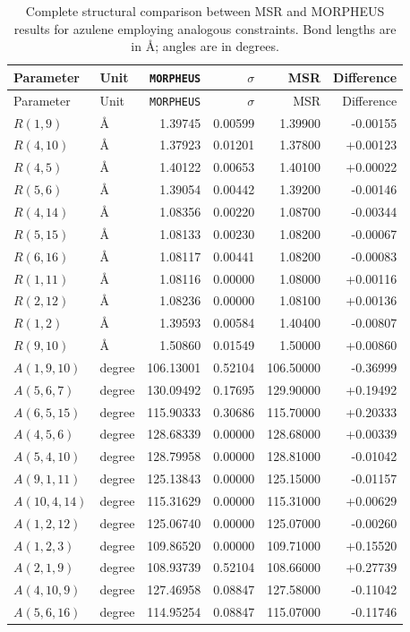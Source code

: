 \documentclass[12pt]{article}
\begin{document}
\begin{longtable}{llrrrr}
\caption{Complete structural comparison between MSR and MORPHEUS results for azulene employing
analogous constraints. Bond lengths are in \AA; angles are in degrees.}\label{tab:si-azulene-msr-parameters}\\
\toprule
Parameter & Unit & \texttt{MORPHEUS} & $\sigma$ & MSR & Difference \\
\midrule
\endfirsthead
\toprule
Parameter & Unit & \texttt{MORPHEUS} & $\sigma$ & MSR & Difference \\
\midrule
\endhead
$R(1,9)$ & \AA & 1.39745 & 0.00599 & 1.39900 & -0.00155 \\
$R(4,10)$ & \AA & 1.37923 & 0.01201 & 1.37800 & +0.00123 \\
$R(4,5)$ & \AA & 1.40122 & 0.00653 & 1.40100 & +0.00022 \\
$R(5,6)$ & \AA & 1.39054 & 0.00442 & 1.39200 & -0.00146 \\
$R(4,14)$ & \AA & 1.08356 & 0.00220 & 1.08700 & -0.00344 \\
$R(5,15)$ & \AA & 1.08133 & 0.00230 & 1.08200 & -0.00067 \\
$R(6,16)$ & \AA & 1.08117 & 0.00441 & 1.08200 & -0.00083 \\
$R(1,11)$ & \AA & 1.08116 & 0.00000 & 1.08000 & +0.00116 \\
$R(2,12)$ & \AA & 1.08236 & 0.00000 & 1.08100 & +0.00136 \\
$R(1,2)$ & \AA & 1.39593 & 0.00584 & 1.40400 & -0.00807 \\
$R(9,10)$ & \AA & 1.50860 & 0.01549 & 1.50000 & +0.00860 \\
$A(1,9,10)$ & degree & 106.13001 & 0.52104 & 106.50000 & -0.36999 \\
$A(5,6,7)$ & degree & 130.09492 & 0.17695 & 129.90000 & +0.19492 \\
$A(6,5,15)$ & degree & 115.90333 & 0.30686 & 115.70000 & +0.20333 \\
$A(4,5,6)$ & degree & 128.68339 & 0.00000 & 128.68000 & +0.00339 \\
$A(5,4,10)$ & degree & 128.79958 & 0.00000 & 128.81000 & -0.01042 \\
$A(9,1,11)$ & degree & 125.13843 & 0.00000 & 125.15000 & -0.01157 \\
$A(10,4,14)$ & degree & 115.31629 & 0.00000 & 115.31000 & +0.00629 \\
$A(1,2,12)$ & degree & 125.06740 & 0.00000 & 125.07000 & -0.00260 \\
$A(1,2,3)$ & degree & 109.86520 & 0.00000 & 109.71000 & +0.15520 \\
$A(2,1,9)$ & degree & 108.93739 & 0.52104 & 108.66000 & +0.27739 \\
$A(4,10,9)$ & degree & 127.46958 & 0.08847 & 127.58000 & -0.11042 \\
$A(5,6,16)$ & degree & 114.95254 & 0.08847 & 115.07000 & -0.11746 \\
\bottomrule
\end{longtable}
\end{document}
